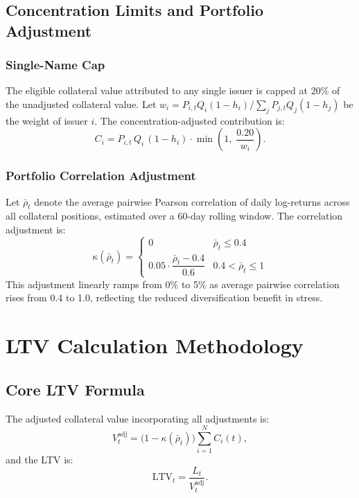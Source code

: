 \documentclass[12pt, a4paper]{article}
\newcommand{\LTV}{\mathrm{LTV}}
\newcommand{\1}{\mathbbm{1}}
\begin{document}
\subsection{Concentration Limits and Portfolio Adjustment}

\subsubsection*{Single-Name Cap}
The eligible collateral value attributed to any single issuer is capped at 20\%
of the unadjusted collateral value. Let $w_i = P_{i,t}Q_i(1-h_i) /
\sum_j P_{j,t}Q_j(1-h_j)$ be the weight of issuer $i$. The concentration-adjusted
contribution is:
\[
C_i = P_{i,t}\,Q_i\,(1 - h_i) \cdot \min\!\left(1,\;\frac{0.20}{w_i}\right).
\]

\subsubsection*{Portfolio Correlation Adjustment}
Let $\bar{\rho}_t$ denote the average pairwise Pearson correlation of daily
log-returns across all collateral positions, estimated over a 60-day rolling window.
The correlation adjustment is:
\begin{equation}
    \kappa(\bar{\rho}_t) =
    \begin{cases}
        0 & \bar{\rho}_t \leq 0.4 \\[4pt]
        0.05\cdot\dfrac{\bar{\rho}_t - 0.4}{0.6} & 0.4 < \bar{\rho}_t \leq 1
    \end{cases}
    \label{eq:kappa}
\end{equation}
This adjustment linearly ramps from 0\% to 5\% as average pairwise correlation
rises from 0.4 to 1.0, reflecting the reduced diversification benefit in stress.

\section{LTV Calculation Methodology}
\label{sec:ltv_calc}

\subsection{Core LTV Formula}

The adjusted collateral value incorporating all adjustments is:
\begin{equation}
    V_t^{\mathrm{adj}} = \bigl(1 - \kappa(\bar{\rho}_t)\bigr)
    \sum_{i=1}^{N} C_i(t),
    \label{eq:Vadj}
\end{equation}
and the LTV is:
\begin{equation}
    \LTV_t = \frac{L_t}{V_t^{\mathrm{adj}}}.
    \label{eq:ltv}
\end{equation}
\end{document}
